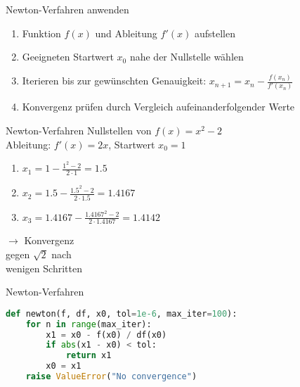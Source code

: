 \begin{KR}{Newton-Verfahren anwenden}
\begin{enumerate}
    \item Funktion $f(x)$ und Ableitung $f'(x)$ aufstellen
    \item Geeigneten Startwert $x_0$ nahe der Nullstelle wählen
    \item Iterieren bis zur gewünschten Genauigkeit:
    $x_{n+1} = x_n - \frac{f(x_n)}{f'(x_n)}$
    \item Konvergenz prüfen durch Vergleich aufeinanderfolgender Werte
\end{enumerate}
\end{KR}

\begin{example2}{Newton-Verfahren} Nullstellen von $f(x)=x^2-2$\\
Ableitung: $f'(x) = 2x$, Startwert $x_0 = 1$
\vspace{1mm}\\
\begin{minipage}[t]{0.65\textwidth}
    \vspace{-3mm}
    \begin{enumerate}
        \item $x_1 = 1 - \frac{1^2-2}{2 \cdot 1} = 1.5$
        \item $x_2 = 1.5 - \frac{1.5^2-2}{2 \cdot 1.5} = 1.4167$
        \item $x_3 = 1.4167 - \frac{1.4167^2-2}{2 \cdot 1.4167} = 1.4142$
    \end{enumerate}
\end{minipage}
\begin{minipage}[t]{0.3\textwidth}
    $\rightarrow$ Konvergenz \\ gegen $\sqrt{2}$ nach \\ wenigen Schritten
\end{minipage}
\end{example2}

\begin{examplecode}{Newton-Verfahren}
    \begin{lstlisting}[language=Python, style=basesmol]
def newton(f, df, x0, tol=1e-6, max_iter=100):
    for n in range(max_iter):
        x1 = x0 - f(x0) / df(x0)
        if abs(x1 - x0) < tol:
            return x1
        x0 = x1
    raise ValueError("No convergence")
    \end{lstlisting}
\end{examplecode}

